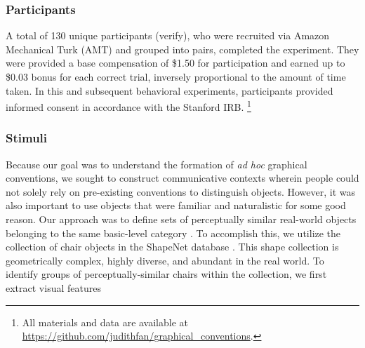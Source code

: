 \documentclass[10pt,letterpaper]{article}
\begin{document}
\subsubsection{Participants}
A total of 130 unique participants (verify), who were recruited via Amazon Mechanical Turk (AMT) and grouped into pairs, completed the experiment. They were provided a base compensation of \$1.50 for participation and earned up to \$0.03 bonus for each correct trial, inversely proportional to the amount of time taken. In this and subsequent behavioral experiments, participants provided informed consent in accordance with the Stanford IRB.
\footnote{All materials and data are available at \url{https://github.com/judithfan/graphical_conventions}.}

\subsubsection{Stimuli}
Because our goal was to understand the formation of \textit{ad hoc} graphical conventions, we sought to construct communicative contexts wherein people could not solely rely on pre-existing conventions to distinguish objects.
However, it was also important to use objects that were familiar and naturalistic for some good reason.
Our approach was to define sets of perceptually similar real-world objects belonging to the same basic-level category \cite{MervisRosch81_CategorizationReview}.
To accomplish this, we utilize the collection of chair objects in the ShapeNet database \cite{chang2015shapenet}.
This shape collection is  geometrically complex, highly diverse, and abundant in the real world.
To identify groups of perceptually-similar chairs within the collection, we first extract visual features

\cite{simonyan2014very}

\end{document}

